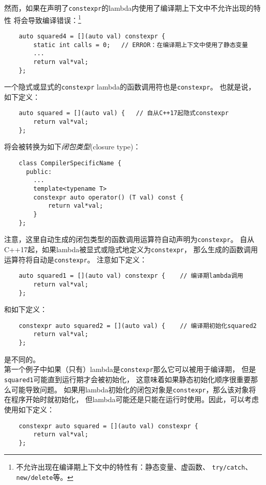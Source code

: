 然而，如果在声明了\texttt{constexpr}的lambda内使用了编译期上下文中不允许出现的特性
将会导致编译错误：\footnote{不允许出现在编译期上下文中的特性有：静态变量、虚函数、
\texttt{try/catch}、\texttt{new/delete}等。}
\begin{lstlisting}
    auto squared4 = [](auto val) constexpr {
        static int calls = 0;   // ERROR：在编译期上下文中使用了静态变量
        ...
        return val*val;
    };
\end{lstlisting}
一个隐式或显式的\texttt{constexpr} lambda的函数调用符也是\texttt{constexpr}。
也就是说，如下定义：
\begin{lstlisting}
    auto squared = [](auto val) {   // 自从C++17起隐式constexpr
        return val*val;
    };
\end{lstlisting}
将会被转换为如下\emph{闭包类型}(closure type)：
\begin{lstlisting}
    class CompilerSpecificName {
      public:
        ...
        template<typename T>
        constexpr auto operator() (T val) const {
            return val*val;
        }
    };
\end{lstlisting}
注意，这里自动生成的闭包类型的函数调用运算符自动声明为\texttt{constexpr}。
自从C++17起，如果lambda被显式或隐式地定义为\texttt{constexpr}，
那么生成的函数调用运算符将自动是\texttt{constexpr}。
注意如下定义：
\begin{lstlisting}
    auto squared1 = [](auto val) constexpr {    // 编译期lambda调用
        return val*val;
    };
\end{lstlisting}
和如下定义：
\begin{lstlisting}
    constexpr auto squared2 = [](auto val) {    // 编译期初始化squared2
        return val*val;
    };
\end{lstlisting}
是不同的。\\
第一个例子中如果（只有）lambda是\texttt{constexpr}那么它可以被用于编译期，
但是\texttt{squared1}可能直到运行期才会被初始化，
这意味着如果静态初始化顺序很重要那么可能导致问题。
如果用lambda初始化的闭包对象是\texttt{constexpr}，那么该对象将在程序开始时就初始化，
但lambda可能还是只能在运行时使用。因此，可以考虑使用如下定义：
\begin{lstlisting}
    constexpr auto squared = [](auto val) constexpr {
        return val*val;
    };
\end{lstlisting}

